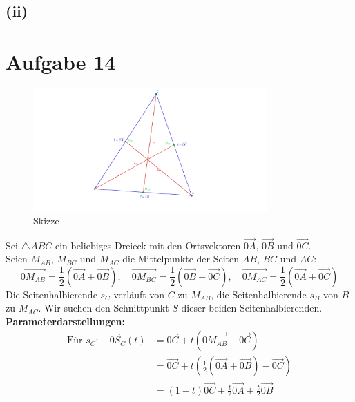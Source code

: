 \documentclass[12pt,a4paper]{article}
\begin{document}
\newpage
\subsection*{(ii)}

\newpage
\section*{Aufgabe 14}
\begin{figure}[htbp]
    \centering        
    \includegraphics[width=0.8\textwidth]{Blatt05_Aufgabe_14.png}
    \caption{Skizze}
    \label{fig:mein_bild}
\end{figure}
\noindent Sei $\triangle ABC$ ein beliebiges Dreieck mit den Ortsvektoren $\overrightarrow{0A}$, $\overrightarrow{0B}$ und $\overrightarrow{0C}$.\\ 
Seien $M_{AB}$, $M_{BC}$ und $M_{AC}$ die Mittelpunkte der Seiten $AB$, $BC$ und $AC$: 
\[ 
    \overrightarrow{0M_{AB}} = \frac{1}{2}(\overrightarrow{0A} + \overrightarrow{0B}), \quad \overrightarrow{0M_{BC}} = \frac{1}{2}(\overrightarrow{0B} + \overrightarrow{0C}), \quad \overrightarrow{0M_{AC}} = \frac{1}{2}(\overrightarrow{0A} + \overrightarrow{0C}) 
\] 
Die Seitenhalbierende $s_C$ verläuft von $C$ zu $M_{AB}$, die Seitenhalbierende $s_B$ von $B$ zu $M_{AC}$. Wir suchen den Schnittpunkt $S$ dieser beiden Seitenhalbierenden. \\ 
\textbf{Parameterdarstellungen:} 
\begin{align*} 
    \text{Für } s_C: \quad \overrightarrow{0S}_C(t) &= \overrightarrow{0C} + t\left(\overrightarrow{0M_{AB}} - \overrightarrow{0C}\right) \\ 
                                                    &= \overrightarrow{0C} + t\left(\frac{1}{2}(\overrightarrow{0A} + \overrightarrow{0B}) - \overrightarrow{0C}\right) \\ 
                                                    &= (1-t)\overrightarrow{0C} + \frac{t}{2}\overrightarrow{0A} + \frac{t}{2}\overrightarrow{0B} 
\end{align*} 
\end{document}

